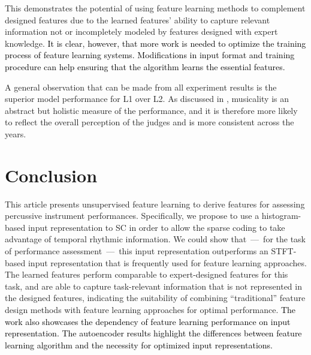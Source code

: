 \documentclass{ws-ijsc}
\newcommand{\highlight}[1]{\textcolor{black}{#1}}
\begin{document}
This demonstrates the potential of using feature learning methods to complement designed features due to the learned features' ability to capture relevant information not or incompletely modeled by features designed with expert knowledge. \highlight{It is clear, however, that more work is needed to optimize the training process of feature learning systems. Modifications in input format and training procedure can help ensuring that the algorithm learns the essential features.}

A general observation that can be made from all experiment results is the superior model performance for L1 over L2. As discussed in \cite{Wu2016}, musicality is an abstract but holistic measure of the performance, and it is therefore more likely to reflect the overall perception of the judges and is more consistent across the years. %


\section{Conclusion}\label{sec:conclusion}
This article presents unsupervised feature learning to derive features for assessing percussive instrument performances. Specifically, we propose to use a histogram-based input representation to SC in order to allow the sparse coding to take advantage of temporal rhythmic information. We could show that~---~for the task of performance assessment~---~this input representation outperforms an STFT-based input representation that is frequently used for feature learning approaches. The learned features perform comparable to expert-designed features for this task, and are able to capture task-relevant information that is not represented in the designed features, indicating the suitability of combining ``traditional'' feature design methods with feature learning approaches for optimal performance. \highlight{The work also showcases the dependency of feature learning performance on input representation. The autoencoder results highlight the differences between feature learning algorithm and the necessity for optimized input representations.}
\end{document}
